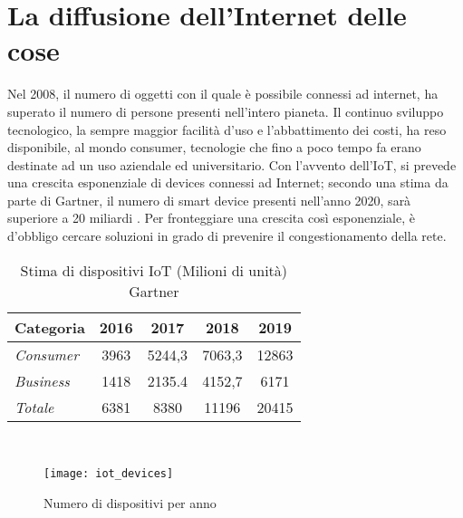 \section{La diffusione dell'Internet delle cose}
Nel 2008, il numero di oggetti con il quale è possibile
connessi ad internet, ha superato il numero di persone presenti nell'intero
pianeta. Il continuo sviluppo tecnologico, la sempre maggior facilità d'uso e
l'abbattimento dei costi, ha reso disponibile, al mondo consumer, tecnologie che
fino a poco tempo fa erano destinate ad un uso aziendale ed universitario. 
Con l'avvento dell'IoT, si prevede una crescita esponenziale di devices connessi
ad Internet;  secondo  una stima da parte di Gartner, il numero di smart
device presenti nell'anno 2020, sarà superiore a 20 miliardi \cite{gartner2016}.
Per fronteggiare una crescita così esponenziale, è d'obbligo cercare soluzioni
in grado di prevenire il congestionamento della rete. 
\\
\begin{table}[ht]
        \centering
        \begin{tabular}{l|c|c|c|c}
                \textbf{Categoria}  & 2016 & 2017 & 2018 & 2019 \\
                \hline
                \emph{Consumer}  & 3963 & 5244,3 & 7063,3 & 12863 \\
                \emph{Business}  & 1418 & 2135.4 & 4152,7 & 6171  \\
                \emph{Totale }   & 6381 & 8380   & 11196  & 20415 \\
        \end{tabular}
        \caption{Stima di dispositivi IoT (Milioni di unità)
        Gartner\cite{gartner2016}}
\end{table}
\\
\begin{figure}[ht]
        \centering 
                \texttt{[image: iot\_devices]}
        \caption{Numero di dispositivi per anno}
\end{figure}

